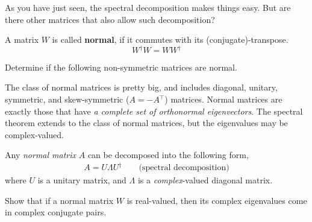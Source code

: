 \documentclass[a4paper,11pt]{exam}
\newcounter{ct}
\newcommand{\trp}{{^\top}} %
\newcommand{\ctrp}{{^\dagger}} %
\begin{document}
\begin{questions}
As you have just seen, the spectral decomposition makes things easy.
But are there other matrices that also allow such decomposition?

\begin{tcolorbox}[colback=black!1!,title=Normal matrices]
    A matrix $W$ is called \textbf{normal}, if it commutes with its (conjugate)-transpose.
    $$W\ctrp W = W W\ctrp$$
\end{tcolorbox}
\question Determine if the following non-symmetric matrices are normal.

The class of normal matrices is pretty big, and includes diagonal, unitary, symmetric, and skew-symmetric ($A = -A\trp$) matrices.
Normal matrices are exactly those that have \emph{a complete set of \emph{orthonormal} eigenvectors}.
The spectral theorem extends to the class of normal matrices, but the eigenvalues may be complex-valued.
\begin{tcolorbox}[colback=black!1!,title=Spectral theorem for Normal matrices]
Any \textit{normal matrix} $A$ can be decomposed into the following form,
\begin{align}\label{eq:spectral:complex}
    A = U \Lambda U\ctrp \qquad \text{(spectral decomposition)}
\end{align}
where $U$ is a unitary matrix, and $\Lambda$ is a \emph{complex}-valued diagonal matrix.
\end{tcolorbox}

\question Show that if a normal matrix $W$ is real-valued, then its complex eigenvalues come in complex conjugate pairs.


\end{questions}
\end{document}
